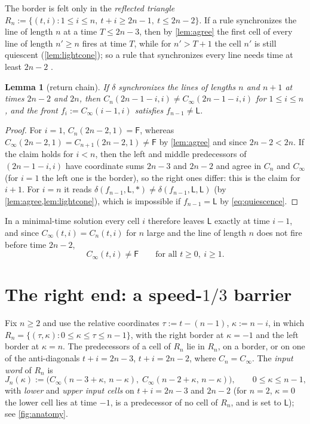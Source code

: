 \documentclass[3p]{elsarticle}
\newtheorem{lemma}[theorem]{Lemma}
\theoremstyle{remark}
\begin{document}
The border is felt only in the \emph{reflected triangle}
$R_n:=\{(t,i):1\le i\le n,\ t+i\ge 2n-1,\ t\le 2n-2\}$. If a rule synchronizes
the line of length $n$ at a time $T\le 2n-3$, then by \cref{lem:agree} the
first cell of every line of length $n'\ge n$ fires at time $T$, while for
$n'>T+1$ the cell $n'$ is still quiescent (\cref{lem:lightcone}); so a rule
that synchronizes every line needs time at least $2n-2$ \cite{Waksman66}.

\begin{lemma}[return chain]\label{lem:return}
If $\delta$ synchronizes the lines of lengths $n$ and $n+1$ at times $2n-2$
and $2n$, then $C_n(2n-1-i,i)\ne C_\infty(2n-1-i,i)$ for $1\le i\le n$, and the
\emph{front} $f_i:=C_\infty(i-1,i)$ satisfies $f_{n-1}\ne\mathsf L$.
\end{lemma}

\begin{proof}
For $i=1$, $C_n(2n-2,1)=\mathsf F$, whereas $C_\infty(2n-2,1)=C_{n+1}(2n-2,1)
\ne\mathsf F$ by \cref{lem:agree} and since $2n-2<2n$. If the claim holds for
$i<n$, then the left and middle predecessors of $(2n-1-i,i)$ have coordinate
sums $2n-3$ and $2n-2$ and agree in $C_n$ and $C_\infty$ (for $i=1$ the left one
is the border), so the right ones differ: this is the claim for $i+1$. For
$i=n$ it reads $\delta(f_{n-1},\mathsf L,\ast)\ne\delta(f_{n-1},\mathsf
L,\mathsf L)$ (by \cref{lem:agree,lem:lightcone}), which is impossible if
$f_{n-1}=\mathsf L$ by \eqref{eq:quiescence}.
\end{proof}

In a minimal-time solution every cell $i$ therefore leaves $\mathsf L$
exactly at time $i-1$, and since $C_\infty(t,i)=C_n(t,i)$ for $n$ large and
the line of length $n$ does not fire before time $2n-2$,
\begin{equation}\label{eq:neverfire}
C_\infty(t,i)\neq\mathsf F\qquad\text{for all }t\ge0,\ i\ge1 .
\end{equation}

\section{The right end: a speed-\texorpdfstring{$1/3$}{1/3} barrier}\label{sec:right}

Fix $n\ge2$ and use the relative coordinates $\tau:=t-(n-1)$, $\kappa:=n-i$, in
which $R_n=\{(\tau,\kappa):0\le\kappa\le\tau\le n-1\}$, with the right border
at $\kappa=-1$ and the left border at $\kappa=n$. The predecessors of a cell of
$R_n$ lie in $R_n$, on a border, or on one of the anti-diagonals $t+i=2n-3$,
$t+i=2n-2$, where $C_n=C_\infty$. The \emph{input word} of $R_n$ is
\[
J_n(\kappa):=\bigl(C_\infty(n-3+\kappa,\,n-\kappa),\;C_\infty(n-2+\kappa,\,n-\kappa)\bigr),
\qquad 0\le\kappa\le n-1,
\]
with \emph{lower} and \emph{upper input cells} on $t+i=2n-3$ and $2n-2$ (for
$n=2$, $\kappa=0$ the lower cell lies at time $-1$, is a predecessor of no cell
of $R_n$, and is set to $\mathsf L$); see \cref{fig:anatomy}.
\end{document}
